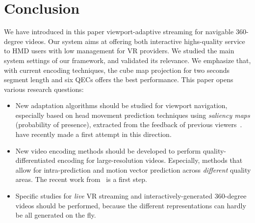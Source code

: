 \section{Conclusion}
\label{sec:conclusion}

We have introduced in this paper viewport-adaptive streaming for
navigable $360$-degree videos. Our system aims at offering both
interactive highs-quality service to \ac{HMD} users with low management
for \ac{VR} providers.
We studied the main system
settings of our framework, and validated its relevance.
We emphasize that, with current encoding techniques, the cube
map projection for two seconds segment length and six
\acp{QEC} offers the best performance. This
paper opens various research questions:
\begin{itemize}
  \item New adaptation algorithms should be studied for viewport navigation,
especially based on head movement prediction techniques using \emph{saliency maps} (probability of
presence), extracted from the feedback of
previous viewers~\cite{han2014spatial}. \citet{allthings} have recently made a first attempt in this
direction.

  \item New video encoding methods should be
developed to perform quality-differentiated encoding for
large-resolution videos. Especially, methods that allow for
intra-prediction and motion vector prediction across \emph{different} quality
areas. The recent work from~\citet{vishyArxiv} is a first step.

\item Specific studies for \emph{live} \ac{VR} streaming
and interactively-generated $360$-degree videos should be performed,
because the different representations can hardly be all
generated on the fly.
\end{itemize}
